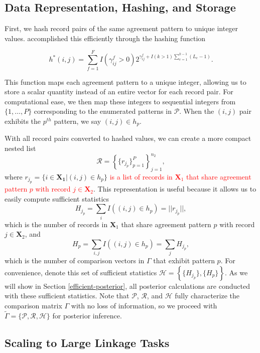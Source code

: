\documentclass[ba]{imsart}
\begin{document}
\hypertarget{data-representation-hashing-and-storage}{%
	\subsection{Data Representation, Hashing, and
		Storage}\label{data-representation-hashing-and-storage}}

First, we hash record pairs of the same agreement pattern to unique integer values. \cite{enamorado2019using} accomplished this efficiently through the hashing function

$$h^{*}(i, j) = \sum_{f = 1}^F I(\gamma_{ij}^f > 0)2^{\gamma_{ij}^f + I(k>1)\sum_{e=1}^{k-1}(L_e -1)}.$$

This function maps each agreement pattern to a unique integer, allowing us to store a scalar quantity instead of an entire vector for each record pair. For computational ease, we then map these integers to sequential integers from $\{1, \ldots, P\}$ corresponding to the enumerated patterns in $\mathcal{P}$. When the $(i, j)$ pair exhibits the $p^{th}$ pattern, we say $(i, j) \in h_p$.

With all record pairs converted to hashed values, we can create a more compact nested list 
$$\mathcal{R} = \left\{\{r_{j_p} \}_{p=1}^{P} \right\}_{j = 1}^{n_2},$$
where $r_{j_p} = \{i \in \bm{X_1} | (i, j) \in h_p\}$ \textcolor{red}{is a list of records in $\bm{X}_1$ that share agreement pattern $p$ with record $j \in \bm{X}_2$}. This representation is useful because it allows us to easily compute sufficient statistics
$$H_{j_p} = \sum_{i} I((i, j) \in h_p) = ||r_{j_p}||,$$
which is the number of records in $\bm{X}_1$ that share agreement pattern $p$ with record $j \in \bm{X}_2$, and 
$$H_p =  \sum_{i, j} I((i, j) \in h_p) = \sum_{j} H_{j_p},$$
which is the number of comparison vectors in $\Gamma$ that exhibit pattern $p$. For convenience, denote this set of sufficient statistics $\mathcal{H} = \left\{\{H_{j_p}\}, \{H_{p}\}\right\}.$ As we will show in Section \ref{efficient-posterior}, all posterior calculations are conducted with these sufficient statistics. Note that $\mathcal{P}$, $\mathcal{R}$, and $\mathcal{H}$  fully characterize the comparison matrix $\Gamma$ with no loss of information, so we proceed with $\tilde{\Gamma} = \{\mathcal{P}, \mathcal{R}, \mathcal{H}\}$ for posterior inference. 

\hypertarget{scaling}{%
	\subsection{Scaling to Large Linkage Tasks}\label{scaling}}
\end{document}
